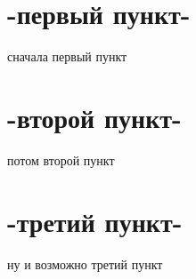 
\newpage
\section{-первый пункт-}
сначала первый пункт


\newpage
\section{-второй пункт-}
потом второй пункт


\newpage
\section{-третий пункт-}
ну и возможно третий пункт



